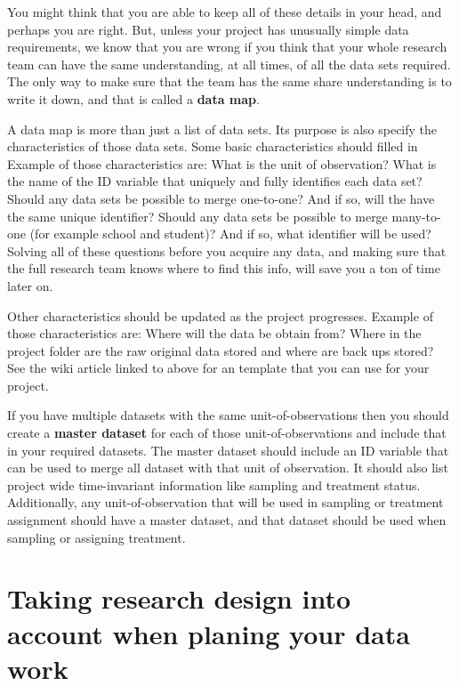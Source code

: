 You might think that you are able to keep all of these details in your head, and perhaps you are right. 
But, unless your project has unusually simple data requirements, 
we know that you are wrong if you think that your whole research team can have the same understanding, 
at all times, of all the data sets required.
The only way to make sure that the team has the same share understanding is to write it down, 
and that is called a \textbf{data map}. 

A data map is more than just a list of data sets. 
Its purpose is also specify the characteristics of those data sets. 
Some basic characteristics should filled in
Example of those characteristics are: 
What is the unit of observation? 
What is the name of the ID variable that uniquely and fully identifies each data set? 
Should any data sets be possible to merge one-to-one? 
And if so, will the have the same unique identifier?
Should any data sets be possible to merge many-to-one (for example school and student)? 
And if so, what identifier will be used?
Solving all of these questions before you acquire any data, 
and making sure that the full research team knows where to find this info,
will save you a ton of time later on.

Other characteristics should be updated as the project progresses.
Example of those characteristics are:
Where will the data be obtain from?
Where in the project folder are the raw original data stored and where are back ups stored?
See the wiki article linked to above for an template that you can use for your project.

If you have multiple datasets with the same unit-of-observations
then you should create a \textbf{master dataset}
for each of those unit-of-observations and include that in your required datasets.
The master dataset should include an ID variable that can be used to merge all dataset with that unit of observation.
It should also list project wide time-invariant information like sampling and treatment status.
Additionally, any unit-of-observation that will be used in sampling or treatment assignment should have a master dataset,
and that dataset should be used when sampling or assigning treatment.


\section{Taking research design into account when planing your data work}

